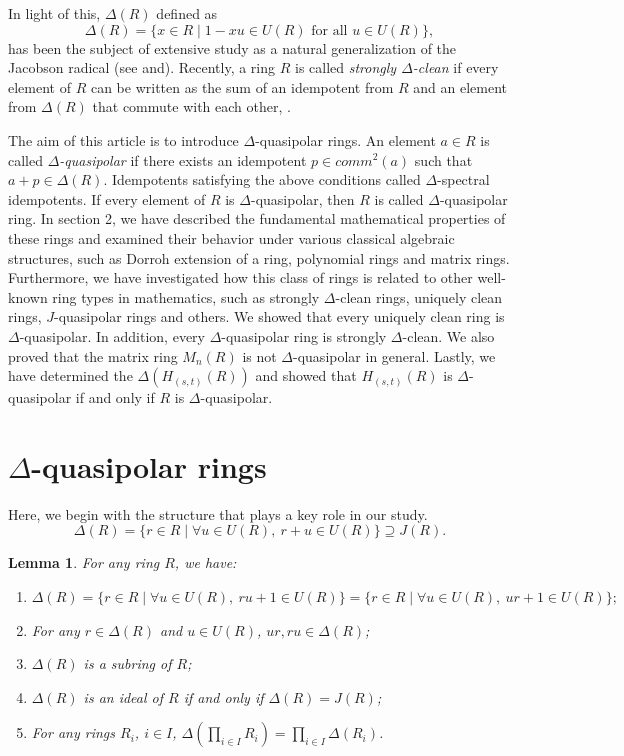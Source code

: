 \documentclass[12pt, reqno]{amsart}
\newtheorem{lem}[thm]{Lemma}
\numberwithin{equation}{section}
\begin{document}
   In light of this, $\Delta(R)$ defined as $$
\Delta(R) = \{ x \in R \mid 1 - xu \in U(R) \text{ for all } u \in U(R) \},$$ has been the subject of extensive study as a natural generalization of the Jacobson radical (see \cite{Leroy} and\cite{Lam2}). Recently, a ring \( R \) is called \emph{strongly \( \Delta \)-clean} if every element of \( R \) can be written as the sum of an idempotent from \( R \) and an element from \( \Delta(R) \) that commute with each other, \cite{Danchev}.


    The aim of this article is to introduce $\Delta$-quasipolar rings. An element $a\in R$ is called \textit{$\Delta$-quasipolar} if there exists an idempotent $p\in comm^2(a)$ such that $a+p\in \Delta(R)$. Idempotents satisfying the above conditions called  $\Delta$-spectral idempotents. If every element of $R$ is $\Delta$-quasipolar, then $R$ is called $\Delta$-quasipolar ring. In section 2, we have described the fundamental mathematical properties of these rings and examined their behavior under various classical algebraic structures, such as Dorroh extension of a ring, polynomial rings and matrix rings. Furthermore, we have investigated how this class of rings is related to other well-known ring types in mathematics, such as strongly $\Delta$-clean rings, uniquely clean rings, $J$-quasipolar rings and others. We showed that every uniquely clean ring is $\Delta$-quasipolar. In addition, every $\Delta$-quasipolar ring is strongly $\Delta$-clean. We also proved that the matrix ring $M_n(R)$ is not $\Delta$-quasipolar in general. Lastly, we have determined the $\Delta(H_{(s,t)}(R))$ and showed that $H_{(s,t)}(R)$ is $\Delta$-quasipolar if and only if $R$ is $\Delta$-quasipolar. 

\section{$\Delta$-quasipolar rings}


Here, we begin with the structure that plays a key role in our study.
\[
\Delta(R) = \{r \in R \mid \forall u \in U(R),\ r + u \in U(R)\}\supseteq J(R).
\]

\begin{lem}\cite[Lemma 1]{Leroy}
 For any ring $R$, we have:
\begin{enumerate}
    \item $\Delta(R) = \{r \in R \mid \forall u \in U(R),\ ru + 1 \in U(R)\} = \{r \in R \mid \forall u \in U(R),\ ur + 1 \in U(R)\};$
    \item \textit{For any $r \in \Delta(R)$ and $u \in U(R)$, $ur, ru \in \Delta(R)$;}
    \item $\Delta(R)$ \textit{is a subring of $R$;}
    \item $\Delta(R)$ \textit{is an ideal of $R$ if and only if $\Delta(R) = J(R)$;}
    \item \textit{For any rings $R_i$, $i \in I$, $\Delta\left( \prod_{i \in I} R_i \right) = \prod_{i \in I} \Delta(R_i)$.}
\end{enumerate}
\end{lem}
\end{document}
